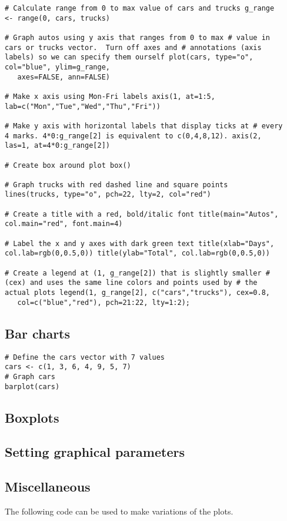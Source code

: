 \documentclass[a4paper,12pt]{article}
\begin{document}
\begin{itemize}
\begin{myindentpar}{1cm}
\begin{verbatim}
# Calculate range from 0 to max value of cars and trucks g_range
<- range(0, cars, trucks)

# Graph autos using y axis that ranges from 0 to max # value in
cars or trucks vector.  Turn off axes and # annotations (axis
labels) so we can specify them ourself plot(cars, type="o",
col="blue", ylim=g_range,
   axes=FALSE, ann=FALSE)

# Make x axis using Mon-Fri labels axis(1, at=1:5,
lab=c("Mon","Tue","Wed","Thu","Fri"))

# Make y axis with horizontal labels that display ticks at # every
4 marks. 4*0:g_range[2] is equivalent to c(0,4,8,12). axis(2,
las=1, at=4*0:g_range[2])

# Create box around plot box()

# Graph trucks with red dashed line and square points
lines(trucks, type="o", pch=22, lty=2, col="red")

# Create a title with a red, bold/italic font title(main="Autos",
col.main="red", font.main=4)

# Label the x and y axes with dark green text title(xlab="Days",
col.lab=rgb(0,0.5,0)) title(ylab="Total", col.lab=rgb(0,0.5,0))

# Create a legend at (1, g_range[2]) that is slightly smaller #
(cex) and uses the same line colors and points used by # the
actual plots legend(1, g_range[2], c("cars","trucks"), cex=0.8,
   col=c("blue","red"), pch=21:22, lty=1:2);

\end{verbatim}
\end{myindentpar}
\subsection{Bar charts}
\begin{myindentpar}{1cm}
\begin{verbatim}
# Define the cars vector with 7 values
cars <- c(1, 3, 6, 4, 9, 5, 7)
# Graph cars
barplot(cars)
\end{verbatim}
\end{myindentpar}
\subsection{Boxplots}
\subsection{Setting graphical parameters}
\subsection{Miscellaneous}
The following code can be used to make variations of the plots.


\end{itemize}
\end{document}
